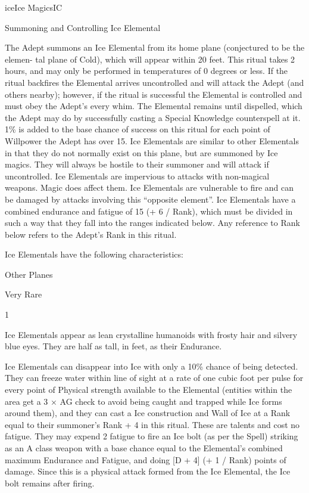 \begin{College}[1.5]{ice}{Ice Magics}{IC}
\begin{ritual}[R-2]{Summoning and Controlling Ice Elemental}
\begin{effects}
The Adept summons an Ice Elemental from its home plane (conjectured to
be the elemen- tal plane of Cold), which will appear within 20 feet.
This ritual takes 2 hours, and may only be performed in temperatures
of 0 degrees or less.  If the ritual backfires the Elemental arrives
uncontrolled and will attack the Adept (and others nearby); however,
if the ritual is successful the Elemental is controlled and must obey
the Adept’s every whim.  The Elemental remains until dispelled, which
the Adept may do by successfully casting a Special Knowledge
counterspell at it. 1\% is added to the base chance of success on this
ritual for each point of Willpower the Adept has over 15.  Ice
Elementals are similar to other Elementals in that they do not
normally exist on this plane, but are summoned by Ice magics. They
will always be hostile to their summoner and will attack if
uncontrolled.  Ice Elementals are impervious to attacks with
non-magical weapons.  Magic does affect them. Ice Elementals are
vulnerable to fire and can be damaged by attacks involving this
“opposite element”.  Ice Elementals have a combined endurance and
fatigue of 15 (+ 6 / Rank), which must be divided in such a way that
they fall into the ranges indicated below.  Any reference to Rank
below refers to the Adept’s Rank in this ritual.

Ice Elementals have the following characteristics: 
\begin{Description}
\item[Habitat] Other Planes  

\item[Frequency] Very Rare  

\item[Number] 1 

\item[Description] Ice Elementals appear as lean crystalline humanoids
  with frosty hair and silvery blue eyes.  They are half as tall, in
  feet, as their Endurance.

\item[Talents, Skills and Magic] Ice Elementals can disappear into Ice
  with only a 10\% chance of being detected. They can freeze water
  within line of sight at a rate of one cubic foot per pulse for every
  point of Physical strength available to the Elemental (entities
  within the area get a 3 × AG check to avoid being caught and trapped
  while Ice forms around them), and they can cast a Ice construction
  and Wall of Ice at a Rank equal to their summoner’s Rank + 4 in this
  ritual.  These are talents and cost no fatigue. They may expend 2
  fatigue to fire an Ice bolt (as per the Spell) striking as an A
  class weapon with a base chance equal to the Elemental’s combined
  maximum Endurance and Fatigue, and doing [D + 4] (+ 1 / Rank) points
  of damage.  Since this is a physical attack formed from the Ice
  Elemental, the Ice bolt remains after firing.


\end{Description}
\end{effects}
\end{ritual}
\end{College}
